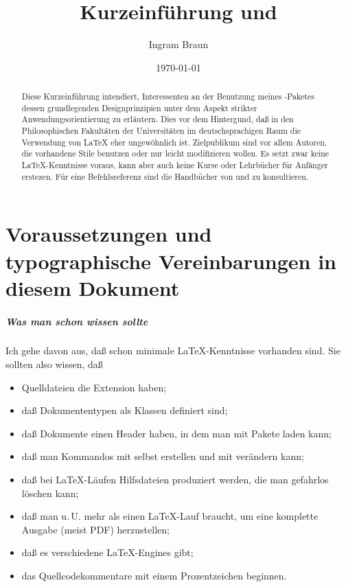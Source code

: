 \documentclass[12pt]{scrreprt}
\title{Kurzeinführung \blx und \archbib [v2.3]}
\author{Ingram Braun}
\date{\today}
\begin{document}
\maketitle

\begin{abstract}\noindent
Diese Kurzeinführung intendiert, Interessenten an der Benutzung meines \archbib-Paketes dessen grundlegenden Designprinzipien unter dem Aspekt strikter Anwendungsorientierung zu erläutern. Dies vor dem Hintergund, daß in den Philosophischen Fakultäten der Universitäten im deutschsprachigen Raum die Verwendung von \LaTeX{} eher ungewöhnlich ist. Zielpublikum sind vor allem Autoren, die vorhandene Stile benutzen oder nur leicht modifizieren wollen. Es setzt zwar keine \LaTeX{}-Kenntnisse voraus, kann aber auch keine Kurse oder Lehrbücher für Anfänger erstezen. Für eine Befehlsreferenz sind die Handbücher von \blx und \archbib zu konsultieren.
\end{abstract}
 
\tableofcontents

\chapter{Voraussetzungen und typographische Vereinbarungen in diesem Dokument}

\paragraph{Was man schon wissen sollte}
Ich gehe davon aus, daß schon minimale \LaTeX-Kenntnisse vorhanden sind. Sie sollten also wissen, daß
\begin{itemize}
\item Quelldateien die Extension  haben;
\item daß Dokumententypen als Klassen definiert sind;
\item daß Dokumente einen Header haben, in dem man mit  Pakete laden kann;
\item daß man Kommandos mit  selbst erstellen und mit  verändern kann;
\item daß bei \LaTeX-Läufen Hilfsdateien produziert werden, die man gefahrlos löschen kann;
\item daß man u.\,U. mehr als einen \LaTeX-Lauf braucht, um eine komplette Ausgabe (meist PDF) herzustellen;
\item daß es verschiedene \LaTeX-Engines gibt;
\item das Quellcodekommentare mit einem Prozentzeichen beginnen.
\end{itemize}
\end{document}
